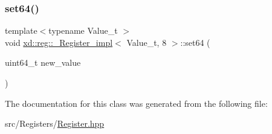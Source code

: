 \subsubsection{\texorpdfstring{set64()}{set64()}}
{\footnotesize\ttfamily template$<$typename Value\+\_\+t $>$ \\
void \mbox{\hyperlink{classxd_1_1reg_1_1___register__impl}{xd\+::reg\+::\+\_\+\+Register\+\_\+impl}}$<$ Value\+\_\+t, 8 $>$\+::set64 (\begin{DoxyParamCaption}\item[{uint64\+\_\+t}]{new\+\_\+value }\end{DoxyParamCaption})\hspace{0.3cm}{\ttfamily [inline]}}



The documentation for this class was generated from the following file\+:\begin{DoxyCompactItemize}
\item 
src/\+Registers/\mbox{\hyperlink{_register_8hpp}{Register.\+hpp}}\end{DoxyCompactItemize}
